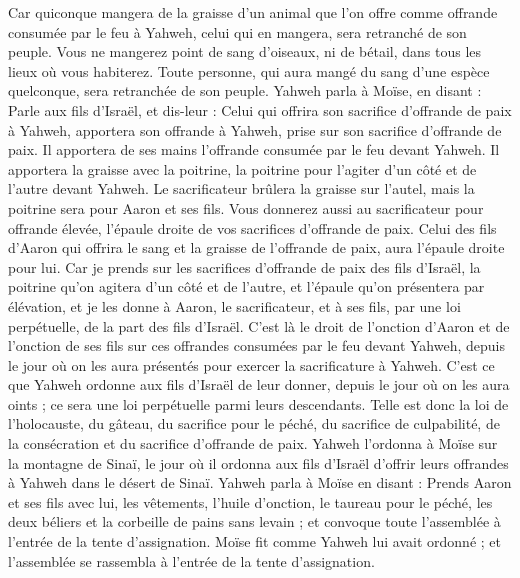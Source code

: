 \begin{multicols}{2}
Car quiconque mangera de la graisse d’un animal que l’on offre comme offrande consumée par le feu à Yahweh, celui qui en mangera, sera retranché de son peuple.
Vous ne mangerez point de sang d'oiseaux, ni de bétail, dans tous les lieux où vous habiterez.
Toute personne, qui aura mangé du sang d’une espèce quelconque, sera retranchée de son peuple.
Yahweh parla à Moïse, en disant :
Parle aux fils d'Israël, et dis-leur : Celui qui offrira son sacrifice d’offrande de paix à Yahweh, apportera son offrande à Yahweh, prise sur son sacrifice d’offrande de paix.
Il apportera de ses mains l’offrande consumée par le feu devant Yahweh. Il apportera la graisse avec la poitrine, la poitrine pour l’agiter d’un côté et de l’autre devant Yahweh.
Le sacrificateur brûlera la graisse sur l'autel, mais la poitrine sera pour Aaron et ses fils.
Vous donnerez aussi au sacrificateur pour offrande élevée, l’épaule droite de vos sacrifices d’offrande de paix.
Celui des fils d'Aaron qui offrira le sang et la graisse de l’offrande de paix, aura l’épaule droite pour lui.
Car je prends sur les sacrifices d’offrande de paix des fils d'Israël, la poitrine qu’on agitera d’un côté et de l’autre, et l'épaule qu’on présentera par élévation, et je les donne à Aaron, le sacrificateur, et à ses fils, par une loi perpétuelle, de la part des fils d'Israël.
C'est là le droit de l'onction d'Aaron et de l'onction de ses fils sur ces offrandes consumées par le feu devant Yahweh, depuis le jour où on les aura présentés pour exercer la sacrificature à Yahweh.
C’est ce que Yahweh ordonne aux fils d'Israël de leur donner, depuis le jour où on les aura oints ; ce sera une loi perpétuelle parmi leurs descendants.
Telle est donc la loi de l'holocauste, du gâteau, du sacrifice pour le péché, du sacrifice de culpabilité, de la consécration et du sacrifice d’offrande de paix.
Yahweh l’ordonna à Moïse sur la montagne de Sinaï, le jour où il ordonna aux fils d'Israël d'offrir leurs offrandes à Yahweh dans le désert de Sinaï.
\VerseOne{}Yahweh parla à Moïse en disant :
Prends Aaron et ses fils avec lui, les vêtements, l'huile d'onction, le taureau pour le péché, les deux béliers et la corbeille de pains sans levain ;
et convoque toute l'assemblée à l'entrée de la tente d'assignation.
Moïse fit comme Yahweh lui avait ordonné ; et l'assemblée se rassembla à l'entrée de la tente d'assignation.

\end{multicols}
